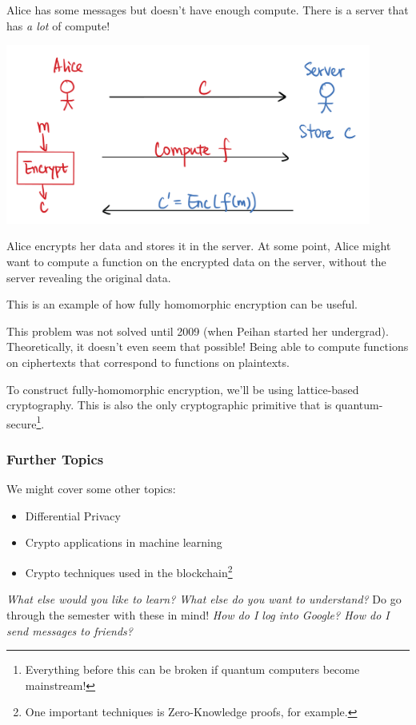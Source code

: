 \begin{example*}
    Alice has some messages but doesn't have enough compute. There is a server that has \emph{a lot} of compute!

    \begin{center}
        \includegraphics[width=0.9\textwidth]{images/2023-01-26/outsourced_computation.png}
    \end{center}

    Alice encrypts her data and stores it in the server. At some point, Alice might want to compute a function on the encrypted data on the server, without the server revealing the original data.

    This is an example of how fully homomorphic encryption can be useful.
\end{example*}

\begin{remark*}
    This problem was not solved until 2009 (when Peihan started her undergrad). Theoretically, it doesn't even seem that possible! Being able to compute functions on ciphertexts that correspond to functions on plaintexts.
\end{remark*}

To construct fully-homomorphic encryption, we'll be using lattice-based cryptography. This is also the only cryptographic primitive that is quantum-secure\footnote{Everything before this can be broken if quantum computers become mainstream!}.

\subsubsection{Further Topics}
We might cover some other topics:
\begin{itemize}
    \item Differential Privacy
    \item Crypto applications in machine learning
    \item Crypto techniques used in the blockchain\footnote{One important techniques is Zero-Knowledge proofs, for example.}
\end{itemize}
\emph{What else would you like to learn? What else do you want to understand?} Do go through the semester with these in mind! \emph{How do I log into Google? How do I send messages to friends?}

